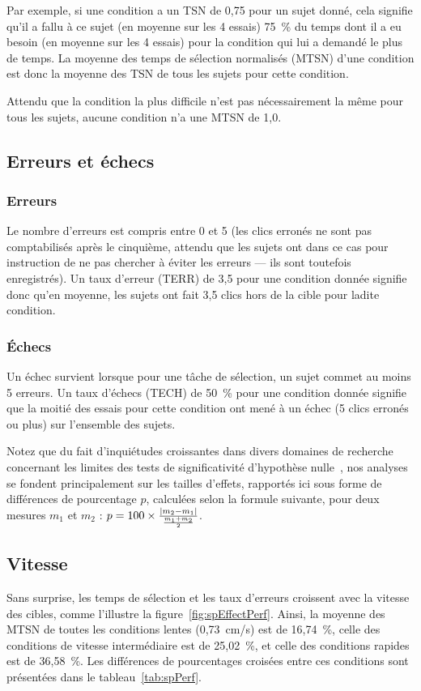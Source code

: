 	Par exemple, si une condition a un TSN de 0,75 pour un sujet donné, cela signifie qu'il a fallu à ce sujet (en moyenne sur les 4 essais) 75~\%{} du temps dont il a eu besoin (en moyenne sur les 4 essais) pour la condition qui lui a demandé le plus de temps. La moyenne des temps de sélection normalisés (MTSN) d'une condition est donc la moyenne des TSN de tous les sujets pour cette condition.
	
	Attendu que la condition la plus difficile n'est pas nécessairement la même pour tous les sujets, aucune condition n'a une MTSN de 1,0.
	
	\subsection{Erreurs et échecs}
	\subsubsection{Erreurs}
	Le nombre d'erreurs est compris entre 0 et 5 (les clics erronés ne sont pas comptabilisés après le cinquième, attendu que les sujets ont dans ce cas pour instruction de ne pas chercher à éviter les erreurs --- ils sont toutefois enregistrés). Un taux d'erreur (TERR) de 3,5 pour une condition donnée signifie donc qu'en moyenne, les sujets ont fait 3,5 clics hors de la cible pour ladite condition.
	
	\subsubsection{Échecs}
	Un échec survient lorsque pour une tâche de sélection, un sujet commet au moins 5 erreurs. 	Un taux d'échecs (TECH) de 50~\%{} pour une condition donnée signifie que la moitié des essais pour cette condition ont mené à un échec (5 clics erronés ou plus) sur l'ensemble des sujets.
	
	Notez que du fait d'inquiétudes croissantes dans divers domaines de recherche concernant les limites des tests de significativité d'hypothèse nulle~\cite{dragicevic2014running, cumming2014new}, nos analyses se fondent principalement sur les tailles d'effets, rapportés ici sous forme de différences de pourcentage $p$, calculées selon la formule suivante, pour deux mesures $m_{1}$ et $m_{2}$ : $p = 100 \times \frac{\abs*{m_{2} - m_{1}}}{\frac{m_{1} + m_{2}}{2}}$.

	\subsection{Vitesse}
	Sans surprise, les temps de sélection et les taux d'erreurs croissent avec la vitesse des cibles, comme l'illustre la figure~\ref{fig:spEffectPerf}. Ainsi, la moyenne des MTSN de toutes les conditions lentes (0,73~cm/s) est de 16,74~\%{}, celle des conditions de vitesse intermédiaire est de 25,02~\%{}, et celle des conditions rapides est de 36,58~\%{}. Les différences de pourcentages croisées entre ces conditions sont présentées dans le tableau~\ref{tab:spPerf}.

